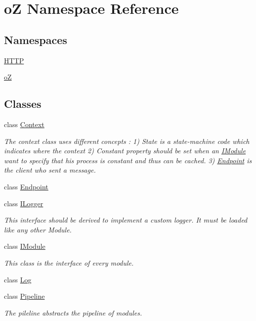 \hypertarget{namespaceo_z}{}\section{oZ Namespace Reference}
\label{namespaceo_z}
\subsection*{Namespaces}
\begin{DoxyCompactItemize}
\item 
 \mbox{\hyperlink{namespaceo_z_1_1_h_t_t_p}{H\+T\+TP}}
\item 
 \mbox{\hyperlink{namespaceo_z_1_1o_z}{oZ}}
\end{DoxyCompactItemize}
\subsection*{Classes}
\begin{DoxyCompactItemize}
\item 
class \mbox{\hyperlink{classo_z_1_1_context}{Context}}
\begin{DoxyCompactList}\small\item\em The context class uses different concepts \+: 1) State is a state-\/machine code which indicates where the context 2) Constant property should be set when an \mbox{\hyperlink{classo_z_1_1_i_module}{I\+Module}} want to specify that his process is constant and thus can be cached. 3) \mbox{\hyperlink{classo_z_1_1_endpoint}{Endpoint}} is the client who sent a message. \end{DoxyCompactList}\item 
class \mbox{\hyperlink{classo_z_1_1_endpoint}{Endpoint}}
\item 
class \mbox{\hyperlink{classo_z_1_1_i_logger}{I\+Logger}}
\begin{DoxyCompactList}\small\item\em This interface should be derived to implement a custom logger. It must be loaded like any other Module. \end{DoxyCompactList}\item 
class \mbox{\hyperlink{classo_z_1_1_i_module}{I\+Module}}
\begin{DoxyCompactList}\small\item\em This class is the interface of every module. \end{DoxyCompactList}\item 
class \mbox{\hyperlink{classo_z_1_1_log}{Log}}
\item 
class \mbox{\hyperlink{classo_z_1_1_pipeline}{Pipeline}}
\begin{DoxyCompactList}\small\item\em The pileline abstracts the pipeline of modules. \end{DoxyCompactList}\end{DoxyCompactItemize}
